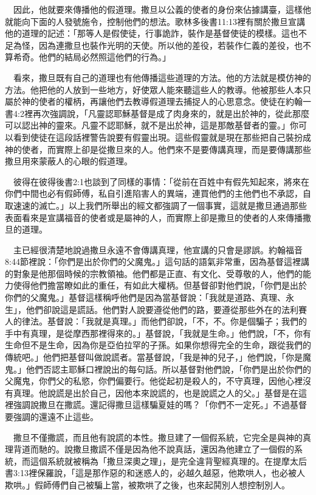 \documentclass{book}
\begin{document}
　因此，他就要來傳播他的假道理。撒旦以公義的使者的身份來佔據講臺，這樣他就能向下面的人發號施令，控制他們的想法。歌林多後書11:13裡有關於撒旦宣講他的道理的記述：「那等人是假使徒，行事詭詐，裝作是基督使徒的模樣。這也不足為怪，因為連撒旦也裝作光明的天使。所以他的差役，若裝作仁義的差役，也不算希奇。他們的結局必然照這他們的行為。」

　看來，撒旦既有自己的道理也有他傳播這些道理的方法。他的方法就是模仿神的方法。他把他的人放到一些地方，好使眾人能來聽這些人的教導。他被那些人本只屬於神的使者的權柄，再讓他們去教導假道理去捕捉人的心思意念。使徒在約翰一書4:2裡再次強調說，「凡靈認耶穌基督是成了肉身來的，就是出於神的，從此那麼可以認出神的靈來。凡靈不認耶穌，就不是出於神，這是那敵基督者的靈。」你可以看到使徒在這段話裡警告說要有假靈出現。這些假靈就是現在那些把自己裝扮成神的使者，而實際上卻是從撒旦來的人。他們來不是要傳講真理，而是要傳講那些撒旦用來蒙蔽人的心眼的假道理。

　彼得在彼得後書2:1也談到了同樣的事情：「從前在百姓中有假先知起來，將來在你們中間也必有假師傅，私自引進陷害人的異端，連買他們的主他們也不承認，自取速速的滅亡。」以上我們所舉出的經文都強調了一個事實，這就是撒旦通過那些表面看來是宣講福音的使者或是屬神的人，而實際上卻是撒旦的使者的人來傳播撒旦的道理。

　主已經很清楚地說過撒旦永遠不會傳講真理，他宣講的只會是謬誤。約翰福音8:44節裡說：「你們是出於你們的父魔鬼。」這句話的語氣非常重，因為基督這裡講的對象是他那個時候的宗教領袖。他們都是正直、有文化、受尊敬的人，他們的能力使得他們擔當瞭如此的重任，有如此大權柄。但基督卻對他們說，「你們是出於你們的父魔鬼。」基督這樣稱呼他們是因為當基督說：「我就是道路、真理、永生」，他們卻說這是謊話。他們對人說要遵從他們的路，要遵從那些外在的法利賽人的律法。基督說：「我就是真理。」而他們卻說，「不，不。你是個騙子；我們的手中有真理，是從摩西那裡得來的。」基督說，「我就是生命。」他們說，「不，你有生命但不是生命，因為你是亞伯拉罕的子孫。如果你想得完全的生命，跟從我們的傳統吧。」他們把基督叫做說謊者。當基督說，「我是神的兒子，」他們說，「你是魔鬼。」他們否認主耶穌口裡說出的每句話。所以基督對他們說，「你們是出於你們的父魔鬼，你們父的私慾，你們偏要行。他從起初是殺人的，不守真理，因他心裡沒有真理。他說謊是出於自己，因他本來說謊的，也是說謊之人的父。」基督是在這裡強調說撒旦在撒謊。還記得撒旦這樣騙夏娃的嗎？「你們不一定死。」不過基督要強調的還遠不止這些。

　撒旦不僅撒謊，而且他有說謊的本性。撒旦建了一個假系統，它完全是與神的真理背道而馳的。說撒旦撒謊不僅是因為他不說真話，還因為他建立了一個假的系統，而這個系統就被稱為「撒旦深奧之理」，是完全違背聖經真理的。在提摩太后書3:13裡保羅說，「這是那作惡的和迷惑人的，必越久越惡，他欺哄人，也必被人欺哄。」假師傅們自己被騙上當，被欺哄了之後，也來起鬨別人想控制別人。
\end{document}
